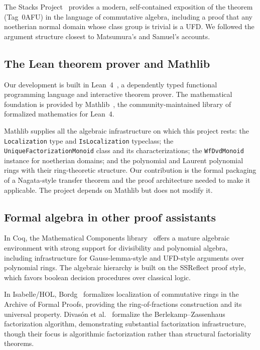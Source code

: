 \documentclass[11pt]{article}
\theoremstyle{plain}
\theoremstyle{definition}
\theoremstyle{remark}
\newcommand{\li}[1]{\texorpdfstring{\texttt{#1}}{#1}}
\begin{document}
The Stacks Project~\cite{stacks} provides a modern, self-contained exposition
of the theorem (Tag~0AFU) in the language of commutative algebra, including a
proof that any noetherian normal domain whose class group is trivial is a UFD.
We followed the argument structure closest to Matsumura's and Samuel's accounts.

\subsection{The Lean theorem prover and Mathlib}

Our development is built in Lean~4~\cite{moura-lean4}, a dependently typed
functional programming language and interactive theorem prover.  The
mathematical foundation is provided by Mathlib~\cite{mathlib}, the
community-maintained library of formalized mathematics for Lean~4.

Mathlib supplies all the algebraic infrastructure on which this project rests:
the \li{Localization} type and \li{IsLocalization} typeclass; the
\li{UniqueFactorizationMonoid} class and its characterizations; the
\li{WfDvdMonoid} instance for noetherian domains; and the polynomial and
Laurent polynomial rings with their ring-theoretic structure.  Our contribution
is the formal packaging of a Nagata-style transfer theorem and the proof
architecture needed to make it applicable.  The project depends on Mathlib but
does not modify it.

\subsection{Formal algebra in other proof assistants}

In Coq, the Mathematical Components library~\cite{mathcomp} offers a mature
algebraic environment with strong support for divisibility and polynomial
algebra, including infrastructure for Gauss-lemma-style and UFD-style arguments
over polynomial rings.  The algebraic hierarchy is built on the SSReflect proof
style, which favors boolean decision procedures over classical logic.

In Isabelle/HOL, Bordg~\cite{bordg-localization} formalizes localization of
commutative rings in the Archive of Formal Proofs, providing the
ring-of-fractions construction and its universal property.
Divas{\'o}n et al.~\cite{divason-berlekamp} formalize the
Berlekamp--Zassenhaus factorization algorithm, demonstrating substantial
factorization infrastructure, though their focus is algorithmic factorization
rather than structural factoriality theorems.
\end{document}
